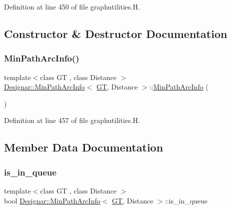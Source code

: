 Definition at line 450 of file graphutilities.\+H.



\subsection{Constructor \& Destructor Documentation}
\mbox{\label{class_designar_1_1_min_path_arc_info_a243f02fd41ed0786f6f2d907843d0598}} 
\subsubsection{\texorpdfstring{Min\+Path\+Arc\+Info()}{MinPathArcInfo()}}
{\footnotesize\ttfamily template$<$class GT , class Distance $>$ \\
\hyperlink{class_designar_1_1_min_path_arc_info}{Designar\+::\+Min\+Path\+Arc\+Info}$<$ \hyperlink{demo-buildgraph_8_c_a3001c40d2c31ca87ed96cd7d1334a55e}{GT}, Distance $>$\+::\hyperlink{class_designar_1_1_min_path_arc_info}{Min\+Path\+Arc\+Info} (\begin{DoxyParamCaption}{ }\end{DoxyParamCaption})\hspace{0.3cm}{\ttfamily [inline]}}



Definition at line 457 of file graphutilities.\+H.



\subsection{Member Data Documentation}
\mbox{\label{class_designar_1_1_min_path_arc_info_a97d17f60e2e02381708f68b79c6bf82d}} 
\subsubsection{\texorpdfstring{is\+\_\+in\+\_\+queue}{is\_in\_queue}}
{\footnotesize\ttfamily template$<$class GT , class Distance $>$ \\
bool \hyperlink{class_designar_1_1_min_path_arc_info}{Designar\+::\+Min\+Path\+Arc\+Info}$<$ \hyperlink{demo-buildgraph_8_c_a3001c40d2c31ca87ed96cd7d1334a55e}{GT}, Distance $>$\+::is\+\_\+in\+\_\+queue}



